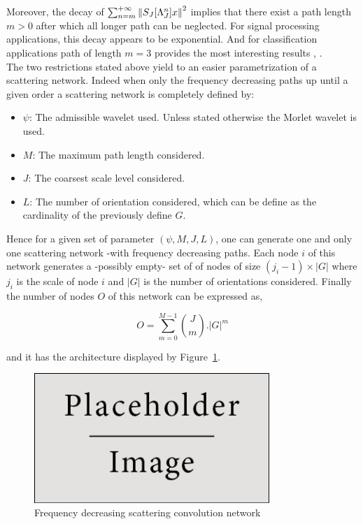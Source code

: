 \documentclass[a4paper,11pt]{report}
\begin{document}
			Moreover, the decay of $\sum_{n=m}^{+\infty} \left\lVert S_{J}[\Lambda_{J}^{n}]x \right\rVert^{2}$ implies that there exist a path length $m > 0$ after which all longer path can be neglected. For signal processing applications, this decay appears to be exponential. And for classification applications path of length $m = 3$ provides the most interesting results \cite{anden2011multiscale}, \cite{bruna2010classification}.\\
			
			The two restrictions stated above yield to an easier parametrization of a scattering network. Indeed when only the frequency decreasing paths up until a given order a scattering network is completely defined by:
			\begin{itemize}
				\item $\psi$: The admissible wavelet used. Unless stated otherwise the Morlet wavelet is used.
			  \item $M$: The maximum path length considered.
			  \item $J$: The coarsest scale level considered.
			  \item $L$: The number of orientation considered, which can be define as the cardinality of the previously define $G$.
			\end{itemize}
			
			Hence for a given set of parameter $(\psi, M,J,L)$, one can generate one and only one scattering network -with frequency decreasing paths. Each node $i$ of this network generates a -possibly empty- set of of nodes of size $(j_{i}-1) \times |G|$ where $j_{i}$ is the scale of node $i$ and $|G|$ is the number of orientations considered. Finally the number of nodes $O$ of this network can be expressed as,
			
			\begin{equation}
			  O = \sum_{m=0}^{M-1} \binom{J}{m} . |G| ^{m}
			  \label{eq:ST number of node}
			\end{equation}

			and it has the architecture displayed by Figure~\ref{fig:SCN 2}. 
			
			\begin{figure}
				\begin{center}
					\includegraphics[width=3.5in]{placeholder.jpg}
					\caption{Frequency decreasing scattering convolution network}
					\label{fig:SCN 2}
				\end{center}	
      \end{figure}
      
\end{document}
